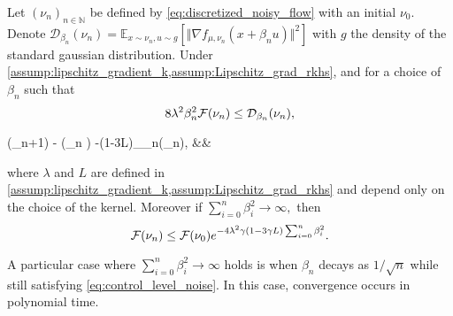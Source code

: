 \begin{proposition}\label{thm:convergence_noisy_gradient}
	Let $(\nu_n)_{n\in \mathbb{N}}$ be defined by \cref{eq:discretized_noisy_flow} with an initial $\nu_0$. Denote $\mathcal{D}_{\beta_n}(\nu_n)=\mathbb{E}_{x\sim \nu_n, u\sim g}[\Vert \nabla f_{\mu,\nu_n}(x+\beta_n u) \Vert^2]$ with $g$ the density of the standard gaussian distribution.	Under \cref{assump:lipschitz_gradient_k,assump:Lipschitz_grad_rkhs}, and for a choice of $\beta_n$ such that
	\begin{equation}\label{eq:control_level_noise}
	8\lambda^2\beta_n^2 {{\mathcal F}}(\nu_n) \leq \mathcal{D}_{\beta_n}(\nu_n),
	\end{equation}
	\begin{flalign}\label{eq:decreasing_loss_iterations}
\quad\quad	\F(\nu_{n+1}) - \F(\nu_n  ) \leq -(1-3\gamma L)_{\beta_n}(\nu_n), &&
	\end{flalign}
	where $\lambda$ and $L$ are defined in \cref{assump:lipschitz_gradient_k,assump:Lipschitz_grad_rkhs} and depend only on the choice of the kernel. Moreover if  $\sum_{i=0}^n \beta_i^2 \rightarrow \infty,$ then
	\begin{equation}
	{{\mathcal F}}(\nu_n)\leq {{\mathcal F}}(\nu_0) e^{-4\lambda^2\gamma(1-3\gamma L)\sum_{i=0}^n \beta^2_i}.
	\end{equation}
\end{proposition}
A particular case where $\sum_{i=0}^n \beta_i^2 \rightarrow \infty$ holds is when $\beta_n$ decays as $1/\sqrt{n}$ while still satisfying \cref{eq:control_level_noise}. In this case, convergence occurs in polynomial time.
